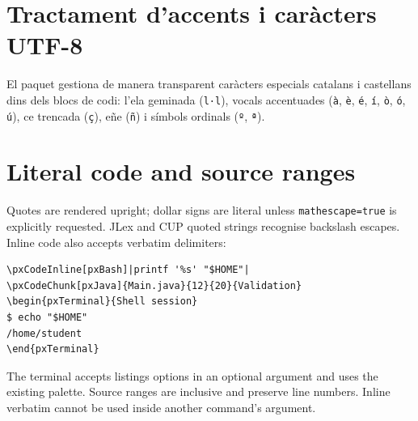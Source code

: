 \documentclass[11pt,a4paper]{article}
\begin{document}
\section{Tractament d'accents i car\`acters UTF-8}

El paquet gestiona de manera transparent car\`acters especials catalans i castellans dins dels blocs de codi:
l'ela geminada (\texttt{l·l}), vocals accentuades (\texttt{à}, \texttt{è}, \texttt{é}, \texttt{í}, \texttt{ò}, \texttt{ó}, \texttt{ú}), ce trencada (\texttt{ç}), e\~ne (\texttt{ñ}) i s\'imbols ordinals (\texttt{º}, \texttt{ª}).

\section{Literal code and source ranges}
Quotes are rendered upright; dollar signs are literal unless
\texttt{mathescape=true} is explicitly requested. JLex and CUP quoted strings
recognise backslash escapes. Inline code also accepts verbatim delimiters:
\begin{verbatim}
\pxCodeInline[pxBash]|printf '%s' "$HOME"|
\pxCodeChunk[pxJava]{Main.java}{12}{20}{Validation}
\begin{pxTerminal}{Shell session}
$ echo "$HOME"
/home/student
\end{pxTerminal}
\end{verbatim}
The terminal accepts listings options in an optional argument and uses the
existing palette. Source ranges are inclusive and preserve line numbers.
Inline verbatim cannot be used inside another command's argument.
\end{document}
